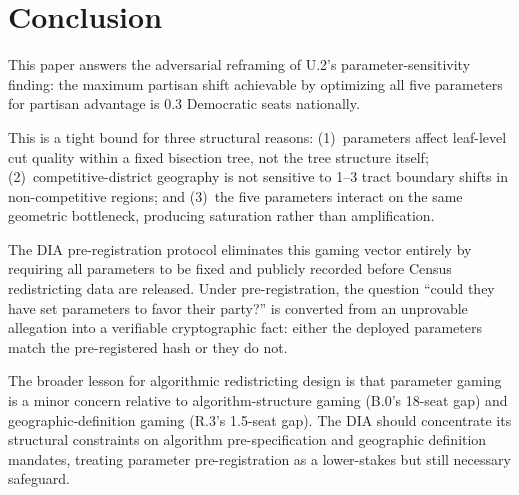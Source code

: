 \section{Conclusion}
\label{sec:conclusion}

This paper answers the adversarial reframing of U.2's parameter-sensitivity
finding: the maximum partisan shift achievable by optimizing all five
\bisect{} parameters for partisan advantage is 0.3 Democratic seats nationally.

This is a tight bound for three structural reasons:
(1)~parameters affect leaf-level cut quality within a fixed bisection tree,
not the tree structure itself;
(2)~competitive-district geography is not sensitive to 1--3 tract boundary
shifts in non-competitive regions;
and (3)~the five parameters interact on the same geometric bottleneck,
producing saturation rather than amplification.

The DIA pre-registration protocol eliminates this gaming vector entirely
by requiring all parameters to be fixed and publicly recorded before Census
redistricting data are released.
Under pre-registration, the question ``could they have set parameters to
favor their party?'' is converted from an unprovable allegation into a
verifiable cryptographic fact: either the deployed parameters match the
pre-registered hash or they do not.

The broader lesson for algorithmic redistricting design is that parameter
gaming is a minor concern relative to algorithm-structure gaming (B.0's
18-seat gap) and geographic-definition gaming (R.3's 1.5-seat gap).
The DIA should concentrate its structural constraints on algorithm
pre-specification and geographic definition mandates, treating parameter
pre-registration as a lower-stakes but still necessary safeguard.
